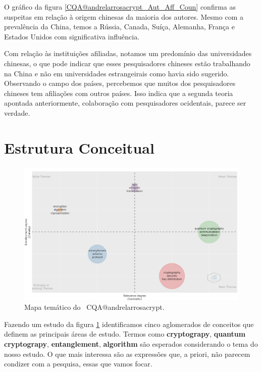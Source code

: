 O gráfico da figura \ref{CQA@andrelarrosacrypt_Aut_Aff_Coun} confirma as suspeitas em relação à origem chinesas da maioria dos autores. Mesmo com a prevalência da China, temos a Rússia, Canada, Suíça, Alemanha, França e Estados Unidos com significativa influência.

Com relação às instituições afiliadas, notamos um predomínio das universidades chinesas, o que pode indicar que esses pesquisadores chineses estão trabalhando na China e não em universidades estrangeirais como havia sido sugerido. Observando o campo dos países, percebemos que muitos dos pesquisadores chineses tem afiliações com outros países. Isso indica que a segunda teoria apontada anteriormente, colaboração com pesquisadores ocidentais, parece ser verdade.

\section{Estrutura Conceitual}

\begin{figure}
    \centering
    \includegraphics[angle=0,width=1\textwidth]{experiments/andrelarrosacrypt/AnaliseBibliometrica/CriptografiaQuantica/imagens/CQA@andrelarrosacrypt_MapaTematico.png}
    \caption{Mapa temático do \dataset\ CQA@andrelarrosacrypt.}
    \label{CQA@andrelarrosacrypt_MapaTematico}
\end{figure}

Fazendo um estudo da figura \ref{CQA@andrelarrosacrypt_MapaTematico} identificamos cinco aglomerados de conceitos que definem as principais áreas de estudo. Termos como \textbf{cryptograpy}, \textbf{quantum cryptograpy}, \textbf{entanglement}, \textbf{algorithm}  são esperados considerando o tema do nosso estudo. O que mais interessa são as expressões que, a priori, não parecem condizer com a pesquisa, essas que vamos focar.


